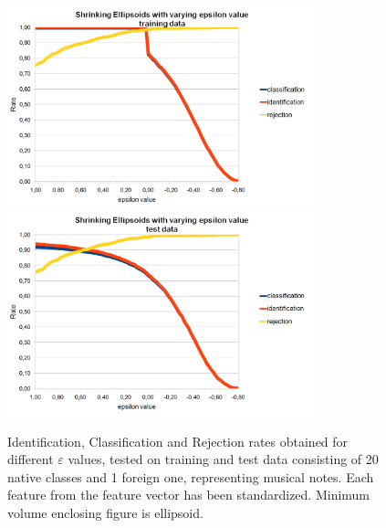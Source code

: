 \begin{figure}[htp]
	\centering
	\includegraphics[width=0.80\textwidth]{Figures/charts/MUSIC_NOTES_STANDARIZED/DIGITS_ShrinkingEllipsoidsToleranceTraining.png}
	\hspace{12pt}
	\includegraphics[width=0.80\textwidth]{Figures/charts/MUSIC_NOTES_STANDARIZED/DIGITS_ShrinkingEllipsoidsToleranceTest.png}
	\caption{ Identification, Classification and Rejection rates obtained for different $\varepsilon$ values, tested on training and test data consisting of 20 native classes and 1 foreign one, representing musical notes. Each feature from the feature vector has been standardized. Minimum volume enclosing figure is ellipsoid. }
\end{figure}

